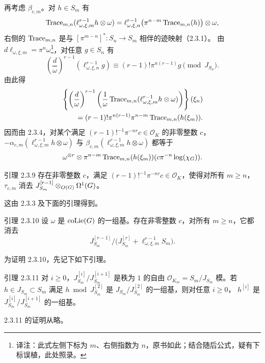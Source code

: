 再考虑 $\beta_{c,m}$。对 $h\in S_m$ 有
\[
\operatorname{Trace}_{m,n}(\ell_{\omega,\xi,m}^{r-1}h\otimes\omega)
=\ell_{\omega,\xi,n}^{r-1}
\bigl(\pi^{n-m}\operatorname{Trace}_{m,n}(h)\bigr)\otimes\omega,
\]
右侧的 $\operatorname{Trace}_{m,n}$ 是与 $[\pi^{m-n}]^*:S_n\to S_m$ 相伴的迹映射（2.3.1）。
由 $d\ell_{\omega,\xi,m}=\pi^n\omega$\footnote{译注：此式左侧下标为 $m$、右侧指数为 $n$，原书如此；结合随后公式，疑有下标误植，此处照录。}，对任意 $g\in S_n$ 有
\[
\left(\frac d\omega\right)^{r-1}
(\ell_{\omega,\xi,n}^{r-1}g)
\equiv(r-1)!\pi^{n(r-1)}g\pmod{J_{S_n}}.
\]
由此得
\begin{align*}
&\left\{\left(\frac d\omega\right)^{r-1}
\left(\frac1\omega\operatorname{Trace}_{m,n}(\ell_{\omega,\xi,m}^{r-1}h\otimes\omega)\right)\right\}(\xi_n)\\
&\hspace{2em}=(r-1)!\pi^{n(r-1)}\pi^{n-m}\operatorname{Trace}_{m,n}(h(\xi_m)).
\end{align*}
因而由 2.3.4，对某个满足 $(r-1)!^{-1}\pi^{-nr}c\in\mathcal O_K$ 的非零整数 $c$，
$-\alpha_{c,m}(\ell_{\omega,\xi,m}^{r-1}h\otimes\omega)$ 与
$\beta_{c,m}(\ell_{\omega,\xi,m}^{r-1}h\otimes\omega)$ 都等于
\[
\omega^{\otimes r}\otimes\pi^{n-m}\operatorname{Trace}_{m,n}(h(\xi_m))
(c\pi^{-n}\log(\chi_G)).
\]
\begin{statement}{引理 2.3.9}
存在非零整数 $c$，满足 $(r-1)!^{-1}\pi^{-nr}c\in\mathcal O_K$，使得对所有 $m\geq n$，
$\tau_{c,m}$ 消去 $J_{S_m}^{[r-1]}\otimes_{O(G)}\Omega^1(G)$。
\end{statement}
这由 2.3.3 及下面的引理得到。
\begin{statement}{引理 2.3.10}
设 $\omega$ 是 $\operatorname{coLie}(G)$ 的一组基。存在非零整数 $c$，对所有 $m\geq n$，它都消去
\[
J_{S_m}^{[r-1]}/\bigl(J_{S_m}^{[r]}+\ell_{\omega,\xi,m}^{r-1}S_m\bigr).
\]
\end{statement}
为证明 2.3.10，先记下如下引理。
\begin{statement}{引理 2.3.11}
对 $i\geq0$，$J_{S_m}^{[i]}/J_{S_m}^{[i+1]}$ 是秩为 $1$ 的自由
$\mathcal O_{K_m}=S_m/J_{S_m}$ 模。若 $h\in J_{S_m}\subset S_m$ 满足
$h\bmod J_{S_m}^{[2]}$ 是 $J_{S_m}/J_{S_m}^{[2]}$ 的一组基，则对任意 $i\geq0$，
$h^{[i]}$ 是 $J_{S_m}^{[i]}/J_{S_m}^{[i+1]}$ 的一组基。
\end{statement}
2.3.11 的证明从略。
